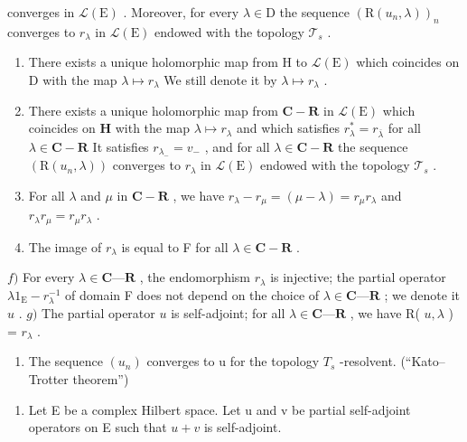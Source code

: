 converges in \(\mathcal{L}(\mathrm{E})\) . Moreover, for every \(\lambda \in \mathrm{D}\) the sequence \((\mathrm{R}(u_n,\lambda))_n\) converges to \(r_{\lambda}\) in \(\mathcal{L}(\mathrm{E})\) endowed with the topology \(\mathcal{T}_s\) .

\begin{enumerate}
\def\labelenumi{\alph{enumi})}
\setcounter{enumi}{1}
\item
  There exists a unique holomorphic map from H to \(\mathcal{L}(\mathrm{E})\) which coincides on D with the map \(\lambda\mapsto r_{\lambda}\) We still denote it by \(\lambda\mapsto r_{\lambda}\) .
\item
  There exists a unique holomorphic map from \(\mathbf{C} - \mathbf{R}\) in \(\mathcal{L}(\mathrm{E})\) which coincides on \(\mathbf{H}\) with the map \(\lambda \mapsto r_{\lambda}\) and which satisfies \(r_{\lambda}^{*} = r_{\overline{\lambda}}\) for all \(\lambda \in \mathbf{C} - \mathbf{R}\) It satisfies \(r_{\lambda_{-}} = v_{-}\) , and for all \(\lambda \in \mathbf{C} - \mathbf{R}\) the sequence \((\mathrm{R}(u_n,\lambda))\) converges to \(r_{\lambda}\) in \(\mathcal{L}(\mathrm{E})\) endowed with the topology \(\mathcal{T}_s\) .
\item
  For all \(\lambda\) and \(\mu\) in \(\mathbf{C} - \mathbf{R}\) , we have \(r_{\lambda} - r_{\mu} = (\mu - \lambda) = r_{\mu}r_{\lambda}\) and \(r_{\lambda}r_{\mu} = r_{\mu}r_{\lambda}\) .\\
\item
  The image of \(r_{\lambda}\) is equal to F for all \(\lambda \in \mathbf{C} - \mathbf{R}\) .
\end{enumerate}

\(f)\) For every \(\lambda\in\mathbf{C}\text{—}\mathbf{R}\) , the endomorphism \(r_{\lambda}\) is injective; the partial operator \(\lambda1_{\mathrm{E}}-r_{\lambda}^{-1}\) of domain F does not depend on the choice of \(\lambda\in\mathbf{C}\text{—}\mathbf{R}\) ; we denote it \(u\) . \(g)\) The partial operator \(u\) is self-adjoint; for all \(\lambda\in\mathbf{C}\text{—}\mathbf{R}\) , we have R( \(u,\lambda\) ) = \(r_{\lambda}\) .

\begin{enumerate}
\def\labelenumi{\alph{enumi})}
\setcounter{enumi}{7}
\tightlist
\item
  The sequence \((u_{n})\) converges to u for the topology \(T_{s}\) -resolvent. (“Kato–Trotter theorem”)
\end{enumerate}

\begin{enumerate}
\def\labelenumi{\arabic{enumi})}
\setcounter{enumi}{31}
\tightlist
\item
  Let E be a complex Hilbert space. Let u and v be partial self-adjoint operators on E such that \(u + v\) is self-adjoint.
\end{enumerate}


